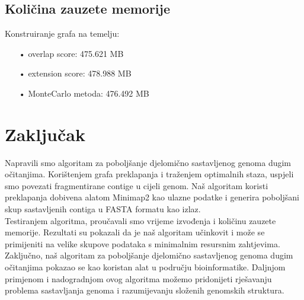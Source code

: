 \documentclass[times, utf8, seminar]{fer}
\begin{document}
\section{Količina zauzete memorije}
Konstruiranje grafa na temelju:
\begin{itemize}
    \item[•]{overlap score: 475.621 MB}
    \item[•]{extension score: 478.988 MB}
    \item[•]{MonteCarlo metoda: 476.492 MB}
\end{itemize}

\chapter{Zaključak}
Napravili smo algoritam za poboljšanje djelomično sastavljenog genoma dugim očitanjima. Korištenjem grafa preklapanja i traženjem optimalnih staza, uspjeli smo povezati fragmentirane contige u cijeli genom. Naš algoritam koristi preklapanja dobivena alatom Minimap2 kao ulazne podatke i generira poboljšani skup sastavljenih contiga u FASTA formatu kao izlaz.
\newline
\\Testiranjem algoritma, proučavali smo vrijeme izvođenja i količinu zauzete memorije. Rezultati su pokazali da je naš algoritam učinkovit i može se primijeniti na velike skupove podataka s minimalnim resursnim zahtjevima.
\newline
\\Zaključno, naš algoritam za poboljšanje djelomično sastavljenog genoma dugim očitanjima pokazao se kao koristan alat u području bioinformatike. Daljnjom primjenom i nadogradnjom ovog algoritma možemo pridonijeti rješavanju problema sastavljanja genoma i razumijevanju složenih genomskih struktura.



\end{document}

